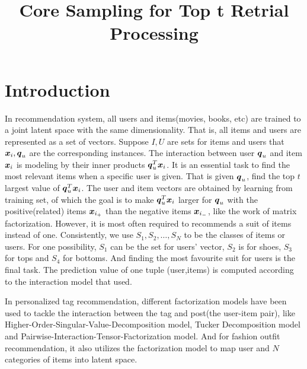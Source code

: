 \documentclass[letterpaper]{article}
\title{Core Sampling for Top t Retrial Processing}
\author{}
\newcommand{\V}[1]{{\bm{{\MakeLowercase{#1}}}}}
\begin{document}
\maketitle

\section{Introduction}

In recommendation system,
all users and items(movies, books, etc) are trained to a joint latent space with the same dimensionality.
That is, all items and users are represented as a set of vectors.
Suppose $I,U$ are sets for items and users that $\V{x}_i,\V{q}_u$ are the corresponding instances.
The interaction between user $\V{q}_u$ and item $\V{x}_i$ is modeling by their inner products $\V{q}_u^T\V{x}_i$.
It is an essential task to find the most relevant items when a specific user is given.
That is given $\V{q}_u$, find the top $t$ largest value of $\V{q}_u^T\V{x}_i$.
The user and item vectors are obtained by learning from training set,
of which the goal is to make $\V{q}_u^T\V{x}_i$ larger for $\V{q}_u$
with the positive(related) items $\V{x}_{i_+}$ than the negative items $\V{x}_{i_-}$,
like the work of matrix factorization\cite{KoYe09}.
However, it is most often required to recommends a suit of items instead of one.
Consistently, we use $S_1,S_2,\ldots,S_N$ to be the classes
of items or users.
For one possibility, $S_1$ can be the set for users' vector,
$S_2$ is for shoes, $S_3$ for tops and $S_4$ for bottoms.
And finding the most favourite suit for users is the final task.
The prediction value of one tuple (user,items) is computed according to the
interaction model that used.

In personalized tag recommendation,
different factorization models have been used to tackle the interaction
between the tag and post(the user-item pair),
like Higher-Order-Singular-Value-Decomposition model\cite{SyNa08},
Tucker Decomposition model\cite{Rendle_RTF} and
Pairwise-Interaction-Tensor-Factorization model\cite{Rendle_PITF}.
And for fashion outfit recommendation\cite{HuYiLa15},
it also utilizes the factorization model to
map user and $N$ categories of items into latent space.
\end{document}
